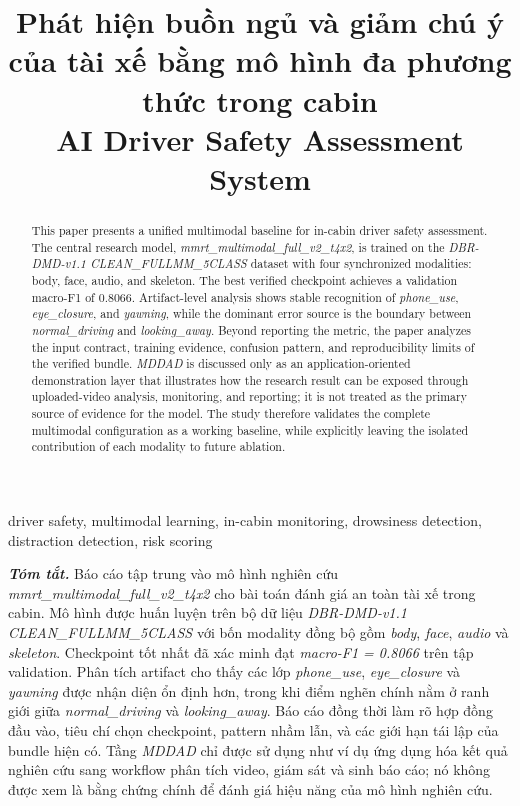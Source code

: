 \documentclass[conference,a4paper]{IEEEtran}
\title{Phát hiện buồn ngủ và giảm chú ý của tài xế bằng mô hình đa phương thức trong cabin\\
\large AI Driver Safety Assessment System}
\author{\IEEEauthorblockN{<Họ tên sinh viên>}\IEEEauthorblockA{<Mã số sinh viên>\\<Khoa / Trường>}}
\begin{document}
\maketitle

\begin{abstract}
This paper presents a unified multimodal baseline for in-cabin driver safety assessment. The central research model, \textit{mmrt\_multimodal\_full\_v2\_t4x2}, is trained on the \textit{DBR-DMD-v1.1 CLEAN\_FULLMM\_5CLASS} dataset with four synchronized modalities: body, face, audio, and skeleton. The best verified checkpoint achieves a validation macro-F1 of 0.8066. Artifact-level analysis shows stable recognition of \textit{phone\_use}, \textit{eye\_closure}, and \textit{yawning}, while the dominant error source is the boundary between \textit{normal\_driving} and \textit{looking\_away}. Beyond reporting the metric, the paper analyzes the input contract, training evidence, confusion pattern, and reproducibility limits of the verified bundle. \textit{MDDAD} is discussed only as an application-oriented demonstration layer that illustrates how the research result can be exposed through uploaded-video analysis, monitoring, and reporting; it is not treated as the primary source of evidence for the model. The study therefore validates the complete multimodal configuration as a working baseline, while explicitly leaving the isolated contribution of each modality to future ablation.
\end{abstract}

\begin{IEEEkeywords}
driver safety, multimodal learning, in-cabin monitoring, drowsiness detection, distraction detection, risk scoring
\end{IEEEkeywords}

\textbf{\textit{Tóm tắt.}} Báo cáo tập trung vào mô hình nghiên cứu \textit{mmrt\_multimodal\_full\_v2\_t4x2} cho bài toán đánh giá an toàn tài xế trong cabin. Mô hình được huấn luyện trên bộ dữ liệu \textit{DBR-DMD-v1.1 CLEAN\_FULLMM\_5CLASS} với bốn modality đồng bộ gồm \textit{body}, \textit{face}, \textit{audio} và \textit{skeleton}. Checkpoint tốt nhất đã xác minh đạt \textit{macro-F1 = 0.8066} trên tập validation. Phân tích artifact cho thấy các lớp \textit{phone\_use}, \textit{eye\_closure} và \textit{yawning} được nhận diện ổn định hơn, trong khi điểm nghẽn chính nằm ở ranh giới giữa \textit{normal\_driving} và \textit{looking\_away}. Báo cáo đồng thời làm rõ hợp đồng đầu vào, tiêu chí chọn checkpoint, pattern nhầm lẫn, và các giới hạn tái lập của bundle hiện có. Tầng \textit{MDDAD} chỉ được sử dụng như ví dụ ứng dụng hóa kết quả nghiên cứu sang workflow phân tích video, giám sát và sinh báo cáo; nó không được xem là bằng chứng chính để đánh giá hiệu năng của mô hình nghiên cứu.
\end{document}
